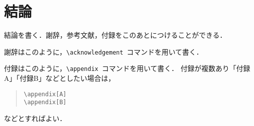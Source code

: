 \documentclass[12pt,oneside]{ise-thesis} %
\begin{document}
\chapter{結論}



結論を書く．謝辞，参考文献，付録をこのあとにつけることができる．


\acknowledgement

謝辞はこのように，\verb+\acknowledgement +コマンドを用いて書く．

% 
% 


\appendix

付録はこのように，\verb+\appendix +コマンドを用いて書く．
付録が複数あり「付録A」「付録B」などとしたい場合は，
\begin{quote}
\verb+\appendix[A]+\\
\verb+\appendix[B]+
\end{quote}
などとすればよい．
\end{document}

